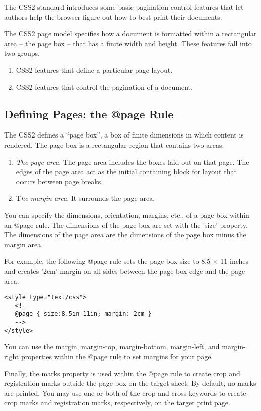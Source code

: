 \documentclass[a4paper,oneside]{book}
\numberwithin{equation}{chapter}
\begin{document}
The CSS2 standard introduces some basic pagination control features that let authors help the browser figure out how to best print their documents.

The CSS2 page model specifies how a document is formatted within a rectangular area -- the page box -- that has a finite width and height. These features fall into two groups.
\begin{enumerate}
\item CSS2 features that define a particular page layout.
\item CSS2 features that control the pagination of a document.
\end{enumerate}
\subsection{Defining Pages: the @page Rule}
The CSS2 defines a ``page box'', a box of finite dimensions in which content is rendered. The page box is a rectangular region that contains two areas.
\begin{enumerate}
\item \textit{The page area}. The page area includes the boxes laid out on that page. The edges of the page area act as the initial containing block for layout that occurs between page breaks.
\item T\textit{he margin area}. It surrounds the page area.
\end{enumerate}
You can specify the dimensions, orientation, margins, etc., of a page box within an @page rule. The dimensions of the page box are set with the 'size' property. The dimensions of the page area are the dimensions of the page box minus the margin area.

For example, the following @page rule sets the page box size to 8.5 × 11 inches and creates '2cm' margin on all sides between the page box edge and the page area.
\begin{verbatim}
<style type="text/css">
   <!--
   @page { size:8.5in 11in; margin: 2cm }
   -->
</style>
\end{verbatim}
You can use the margin, margin-top, margin-bottom, margin-left, and margin-right properties within the @page rule to set margins for your page.

Finally, the marks property is used within the @page rule to create crop and registration marks outside the page box on the target sheet. By default, no marks are printed. You may use one or both of the crop and cross keywords to create crop marks and registration marks, respectively, on the target print page.
\end{document}
